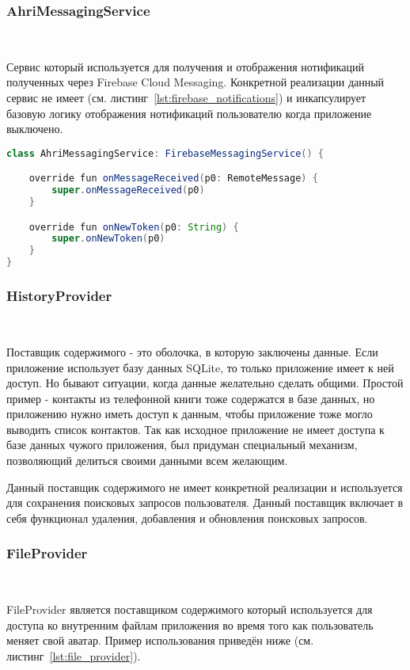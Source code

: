 \subsubsection{AhriMessagingService}~\par

Сервис который используется для получения и отображения нотификаций полученных через Firebase Cloud Messaging. Конкретной реализации данный сервис не имеет (см. листинг~\ref{lst:firebase_notifications}) и инкапсулирует базовую логику отображения нотификаций пользователю когда приложение выключено.

\begin{lstlisting}[language=Java,label={lst:firebase_notifications},caption={AhriMessagingService}]
class AhriMessagingService: FirebaseMessagingService() {

    override fun onMessageReceived(p0: RemoteMessage) {
        super.onMessageReceived(p0)
    }

    override fun onNewToken(p0: String) {
        super.onNewToken(p0)
    }
}
\end{lstlisting}

\subsubsection{HistoryProvider}~\par
Поставщик содержимого - это оболочка, в которую заключены данные. Если приложение использует базу данных SQLite, то только приложение имеет к ней доступ. Но бывают ситуации, когда данные желательно сделать общими. Простой пример - контакты из телефонной книги тоже содержатся в базе данных, но приложению нужно иметь доступ к данным, чтобы приложение тоже могло выводить список контактов. Так как исходное приложение не имеет доступа к базе данных чужого приложения, был придуман специальный механизм, позволяющий делиться своими данными всем желающим.

Данный поставщик содержимого не имеет конкретной реализации и используется для сохранения поисковых запросов пользователя. Данный поставщик включает в себя функционал удаления, добавления и обновления поисковых запросов.

\subsubsection{FileProvider}~\par
FileProvider является поставщиком содержимого который используется для доступа ко внутренним файлам приложения во время того как пользователь меняет свой аватар. Пример использования приведён ниже (см. листинг~\ref{lst:file_provider}).

